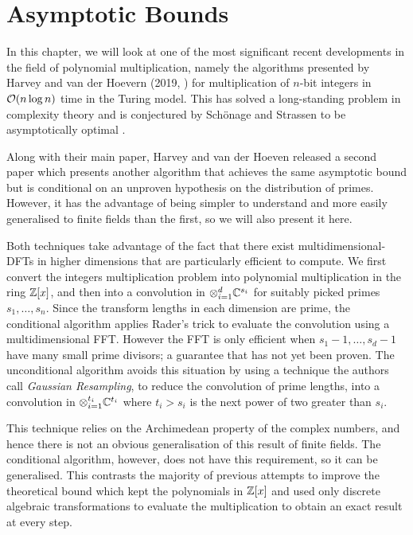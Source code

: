 \chapter{Asymptotic Bounds}\label{chp:asymptotic}

In this chapter, we will look at one of the most significant recent developments in the field of polynomial multiplication, namely the algorithms presented by Harvey and van der Hoevern (2019, \cite{nlogn}) for multiplication of $n$-bit integers in $\mathcal O(n \log n)$ time in the Turing model. This has solved a long-standing problem in complexity theory and is conjectured by Sch\"{o}nage and Strassen to be asymptotically optimal \cite{sch-str-optimality-int-mult}.

\medskip

Along with their main paper, Harvey and van der Hoeven released a second paper \cite{ffnlogn} which presents another algorithm that achieves the same asymptotic bound but is conditional on an unproven hypothesis on the distribution of primes. However, it has the advantage of being simpler to understand and more easily generalised to finite fields than the first, so we will also present it here.

\medskip


Both techniques take advantage of the fact that there exist multidimensional-DFTs in higher dimensions that are particularly efficient to compute. We first convert the integers multiplication problem into polynomial multiplication in the ring ${\mathbb Z}[x]$, and then into a convolution in $\otimes_{i=1}^d {\mathbb C}^{s_i}$ for suitably picked primes $s_1, \ldots, s_n$. Since the transform lengths in each dimension are prime, the conditional algorithm applies Rader's trick to evaluate the convolution using a multidimensional FFT. However the FFT is only efficient when $s_1 - 1, \ldots, s_d - 1$ have many small prime divisors; a guarantee that has not yet been proven. The unconditional algorithm avoids this situation by using a technique the authors call \emph{Gaussian Resampling}, to reduce the convolution of prime lengths, into a convolution in $\otimes_{i=1}^{t_i} {\mathbb C}^{t_i}$ where $t_i > s_i$ is the next power of two greater than $s_i$.

This technique relies on the Archimedean property of the complex numbers, and hence there is not an obvious generalisation of this result of finite fields. The conditional algorithm, however, does not have this requirement, so it can be generalised. This contrasts the majority of previous attempts to improve the theoretical bound which kept the polynomials in ${\mathbb Z}[x]$ and used only discrete algebraic transformations to evaluate the multiplication to obtain an exact result at every step.

